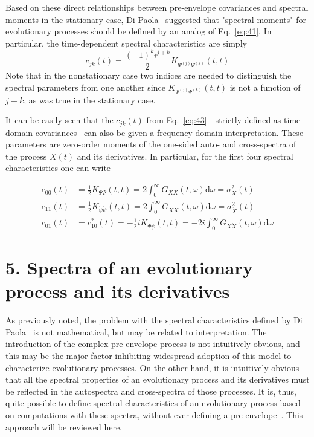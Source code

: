 \documentclass{article}
\begin{document}
Based on these direct relationships between pre-envelope covariances and
spectral moments in the stationary case, Di Paola~{\cite{DiPaola1985}}
suggested that "spectral moments" for evolutionary processes should be defined
by an analog of Eq.~\eqref{eq:41}. In particular, the time-dependent spectral
characteristics are simply
\begin{equation}
  c_{jk} (t) = \frac{(- 1)^k i^{j + k}}{2} K_{\Psi^{(j)} \Psi^{(k)}} (t, t)
  \label{eq:43}
\end{equation}
Note that in the nonstationary case two indices are needed to distinguish the
spectral parameters from one another since $K_{\Psi^{(j)} \Psi^{(k)}} (t, t)$
is not a function of $j + k$, as was true in the stationary case.

It can be easily seen that the $c_{jk} (t)$ from Eq.~\eqref{eq:43} - strictly
defined as time-domain covariances --can also be given a frequency-domain
interpretation. These parameters are zero-order moments of the one-sided auto-
and cross-spectra of the process $X (t)$ and its derivatives. In particular,
for the first four spectral characteristics one can write

\begin{align}
  c_{00} (t) & = \frac{1}{2} K_{\Psi \Psi} (t, t) = 2 \int_0^{\infty} G_{XX}
  (t, \omega) \mathrm{d} \omega = \sigma_X^2 (t) \nonumber\\
  c_{11} (t) & = \frac{1}{2} K_{\dot{\psi} \dot{\psi}} (t, t) = 2
  \int_0^{\infty} G_{\dot{X}  \dot{X}} (t, \omega) \mathrm{d} \omega =
  \sigma_{\dot{X}}^2 (t) \nonumber\\
  c_{01} (t) & = c_{10}^{\ast} (t) = - \frac{1}{2} iK_{\Psi \dot{\psi}} (t, t)
  = - 2 i \int_0^{\infty} G_{X \dot{X}} (t, \omega) \mathrm{d} \omega 
  \label{eq:44}
\end{align}

\section*{5. Spectra of an evolutionary process and its derivatives}

As previously noted, the problem with the spectral characteristics defined by
Di Paola~{\cite{DiPaola1985}} is not mathematical, but may be related to
interpretation. The introduction of the complex pre-envelope process is not
intuitively obvious, and this may be the major factor inhibiting widespread
adoption of this model to characterize evolutionary processes. On the other
hand, it is intuitively obvious that all the spectral properties of an
evolutionary process and its derivatives must be reflected in the autospectra
and cross-spectra of those processes. It is, thus, quite possible to define
spectral characteristics of an evolutionary process based on computations with
these spectra, without ever defining a pre-envelope~{\cite{Michaelov1997}}.
This approach will be reviewed here.
\end{document}
